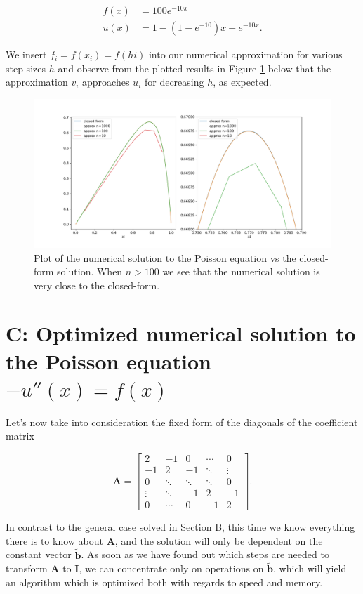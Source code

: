 \documentclass[]{article}
\begin{document}
\begin{align*}
f(x) &= 100e^{-10x} \\
u(x) &= 1 - (1 - e^{-10})x - e^{-10x}.
\end{align*}

We insert $f_i = f(x_i) = f(hi)$ into our numerical approximation for various step sizes $h$ and observe from the plotted results in Figure \ref{fig:calc-results} below that the approximation $v_i$ approaches $u_i$ for decreasing $h$, as expected.

\begin{figure}[t]
	\includegraphics[width=1.2\linewidth]{calc-results.png}
	\caption{Plot of the numerical solution to the Poisson equation vs the closed-form solution. When $n > 100$ we see that the numerical solution is very close to the closed-form.}
	\label{fig:calc-results}
\end{figure}

\section*{C: Optimized numerical solution to the Poisson equation $-u''(x) = f(x)$}
Let's now take into consideration the fixed form of the diagonals of the coefficient matrix

\begin{equation*}
\mathbf{A} = 
\left[ \begin{matrix}
2 & -1 & 0 & \cdots & 0 \\
-1 & 2 & -1 & \ddots & \vdots \\
0 & \ddots & \ddots & \ddots & 0\\
\vdots & \ddots & -1 & 2 & -1 \\
0 & \cdots & 0 & -1 & 2
\end{matrix} \right]\text{.}
\end{equation*}

In contrast to the general case solved in Section B, this time we know everything there is to know about $\mathbf{A}$, and the solution will only be dependent on the constant vector $\mathbf{\tilde{b}}$. As soon as we have found out which steps are needed to transform $\mathbf{A}$ to $\mathbf{I}$, we can concentrate only on operations on $\mathbf{\tilde{b}}$, which will yield an algorithm which is optimized both with regards to speed and memory.
\end{document}
